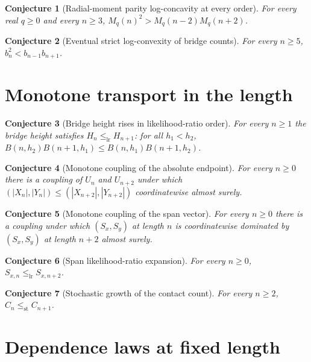 \documentclass[11pt]{article}
\newtheorem{conjecture}{Conjecture}
\theoremstyle{definition}
\begin{document}
\begin{conjecture}[Radial-moment parity log-concavity at every order]\label{af2}
For every real $q\ge0$ and every $n\ge3$, $M_q(n)^2>M_q(n-2)M_q(n+2)$.
\end{conjecture}

\begin{conjecture}[Eventual strict log-convexity of bridge counts]\label{af3}
For every $n\ge5$, $b_n^2<b_{n-1}b_{n+1}$.
\end{conjecture}

\section{Monotone transport in the length}

\begin{conjecture}[Bridge height rises in likelihood-ratio order]\label{af4}
For every $n\ge1$ the bridge height satisfies $H_n\le_{\mathrm{lr}}H_{n+1}$: for all $h_1<h_2$, $B(n,h_2)B(n+1,h_1)\le B(n,h_1)B(n+1,h_2)$.
\end{conjecture}

\begin{conjecture}[Monotone coupling of the absolute endpoint]\label{af5}
For every $n\ge0$ there is a coupling of $U_n$ and $U_{n+2}$ under which $(|X_n|,|Y_n|)\le(|X_{n+2}|,|Y_{n+2}|)$ coordinatewise almost surely.
\end{conjecture}

\begin{conjecture}[Monotone coupling of the span vector]\label{af6}
For every $n\ge0$ there is a coupling under which $(S_x,S_y)$ at length $n$ is coordinatewise dominated by $(S_x,S_y)$ at length $n+2$ almost surely.
\end{conjecture}

\begin{conjecture}[Span likelihood-ratio expansion]\label{af7}
For every $n\ge0$, $S_{x,n}\le_{\mathrm{lr}}S_{x,n+2}$.
\end{conjecture}

\begin{conjecture}[Stochastic growth of the contact count]\label{af8}
For every $n\ge2$, $C_n\le_{\mathrm{st}}C_{n+1}$.
\end{conjecture}

\section{Dependence laws at fixed length}
\end{document}
